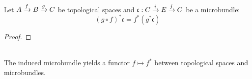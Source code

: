 \\ Let $A \xto{f} B \xto{g} C$ be topological spaces and $\mathfrak{c}: \bundle{C}{E}{i}{j}$ be a microbundle:
\[(g \circ f)^*\mathfrak{c} = f^*(g^*\mathfrak{c})\]
\begin{proof}
    
\end{proof}
\\ The induced microbundle yields a functor $f \mapsto f^*$ between topological spaces and microbundles.